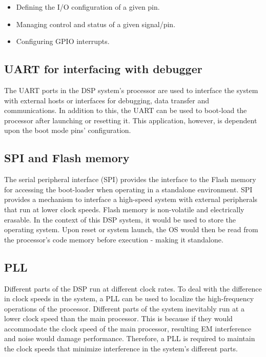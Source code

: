 \begin{itemize}
	\setlength\itemsep{0.1em}
	\item Defining the I/O configuration of a given pin. 
	\item Managing control and status of a given signal/pin. 
	\item Configuring GPIO interrupts. 
\end{itemize}




\subsection{UART for interfacing with debugger}

The UART ports in the DSP system’s processor are used to interface the system with external hosts or interfaces for debugging, data transfer and communications. In addition to this, the UART can be used to boot-load the processor after launching or resetting it. This application, however, is dependent upon the boot mode pins’ configuration. 

\subsection{SPI and Flash memory}

The serial peripheral interface (SPI) provides the interface to the Flash memory for accessing the boot-loader when operating in a standalone environment. SPI provides a mechanism to interface a high-speed system with external peripherals that run at lower clock speeds. Flash memory is non-volatile and electrically erasable. In the context of this DSP system, it would be used to store the operating system. Upon reset or system launch, the OS would then be read from the processor’s code memory before execution - making it standalone. 


\subsection{PLL}
Different parts of the DSP run at different clock rates. To deal with the difference in clock speeds in the system, a PLL can be used to localize the high-frequency operations of the processor. Different parts of the system inevitably run at a lower clock speed than the main processor. This is because if they would accommodate the clock speed of the main processor, resulting EM interference and noise would damage performance. Therefore, a PLL is required to maintain the clock speeds that minimize interference in the system’s different parts. 


